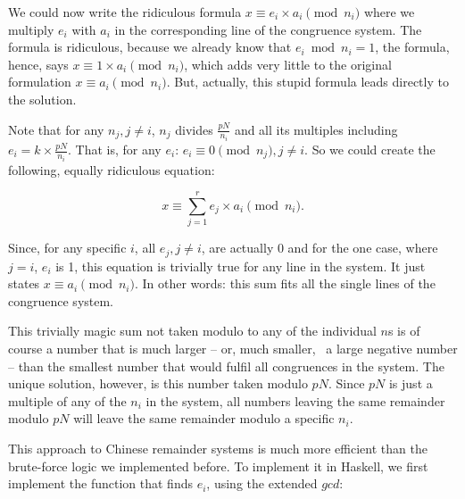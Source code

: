 \documentclass{scrreprt}
\newcommand{\Varid}[1]{\mathit{#1}}
\begin{document}
We could now write the ridiculous formula
$x \equiv e_i \times a_i \pmod{n_i}$ 
where we multiply $e_i$ with $a_i$ in the 
corresponding line of the congruence system.
The formula is ridiculous, because we already know
that $e_i \bmod n_i = 1$, the formula, hence, says
$x \equiv 1 \times a_i \pmod{n_i}$,
which adds very little to the original formulation
$x \equiv a_i \pmod{n_i}$.
But, actually, this stupid formula leads directly
to the solution.

Note that for any $n_j, j \neq i$, 
$n_j$ divides $\frac{pN}{n_i}$ and all its multiples
including $e_i = k \times \frac{pN}{n_i}$.
That is, for any $e_i$: $e_i \equiv 0 \pmod{n_j}, j \neq i$.
So we could create the following, equally ridiculous equation:

\begin{equation}
x \equiv \sum_{j=1}^r{e_j \times a_i} \pmod{n_i}.
\end{equation}

Since, for any specific $i$, all $e_j, j \neq i$,
are actually 0 and for the one case, where $j = i$,
$e_i$ is 1, 
this equation is trivially true
for any line in the system. 
It just states $x \equiv a_i \pmod{n_i}$.
In other words: this sum fits all the single lines
of the congruence system.

This trivially magic sum 
not taken modulo to any of the individual $n$s
is of course a number that is much larger -- or,
much smaller, \ie\ a large negative number --
than the smallest number that would fulfil all
congruences in the system. The unique solution,
however, is this number taken modulo $pN$.
Since $pN$ is just a multiple of any of the $n_i$
in the system, all numbers leaving the same remainder
modulo $pN$ will leave the same remainder
modulo a specific $n_i$.


This approach to Chinese remainder systems
is much more efficient than the brute-force
logic we implemented before.
To implement it in Haskell, we first
implement the function that finds $e_i$,
using the extended \ensuremath{\Varid{gcd}}:
\end{document}
